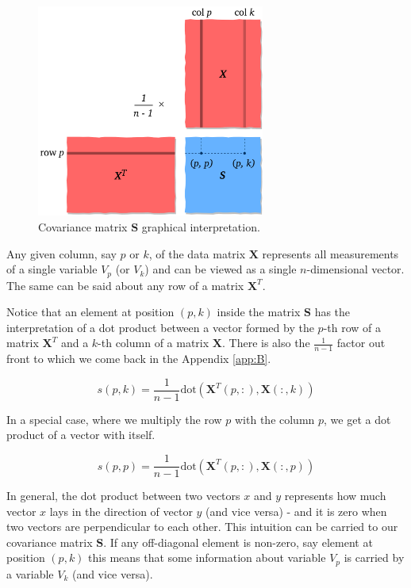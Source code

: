 \documentclass[10pt,twocolumn]{article}
\begin{document}
\begin{figure}[H]
\centering\includegraphics[width=7.5cm]{cov-matrix.png}
\caption{Covariance matrix $\bm{S}$ graphical interpretation.}
\label{fig:covariance-matrix}
\end{figure}

Any given column, say $p$ or $k$, of the data matrix $\bm{X}$ represents all measurements of a single variable $V_p$ (or $V_k$) and can be viewed as a single $n$-dimensional vector. The same can be said about any row of a matrix $\bm{X}^T$.

Notice that an element at position $(p,k)$ inside the matrix $\bm{S}$ has the interpretation of a dot product between a vector formed by the $p$-th row of a matrix $\bm{X}^T$ and a $k$-th column of a matrix $\bm{X}$. There is also the $\frac{1}{n-1}$ factor out front to which we come back in the Appendix \ref{app:B}.

\begin{equation}
s(p,k) = \frac{1}{n-1} \text{dot}( \bm{X}^T(p, :), \bm{X}(:,k))
\end{equation}

In a special case, where we multiply the row $p$ with the column $p$, we get a dot product of a vector with itself.

\begin{equation}
s(p,p) = \frac{1}{n-1} \text{dot}( \bm{X}^T(p, :), \bm{X}(:,p))
\end{equation}

In general, the dot product between two vectors $x$ and $y$ represents how much vector $x$ lays in the direction of vector $y$ (and vice versa) - and it is zero when two vectors are perpendicular to each other. This intuition can be carried to our covariance matrix $\bm{S}$. If any off-diagonal element is non-zero, say element at position $(p,k)$ this means that some information about variable $V_p$ is carried by a variable $V_k$ (and vice versa).
\end{document}
